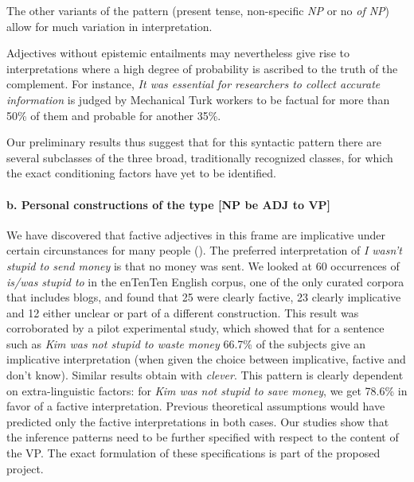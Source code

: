 \documentclass[10pt]{article}
\begin{document}
\vspace{-0.5em}
\vspace{-0.5em}

\noindent
The other variants of the pattern (present tense, non-specific \textit{NP} or no \textit{of NP}) allow for much variation in interpretation.

Adjectives without epistemic entailments may nevertheless give rise to interpretations where a high degree of probability is ascribed to the truth of the complement. For instance, \textit{It was essential for researchers to collect accurate information} is judged by Mechanical Turk workers to be factual for more than 50\% of them and probable for another 35\%. 

Our preliminary results thus suggest that for this syntactic pattern there are several subclasses of the three broad, traditionally recognized classes, for which the exact conditioning factors have yet to be identified.

\vspace{-1.0em}
\paragraph{b. Personal constructions of the type [NP be ADJ to VP]}
We have discovered that factive adjectives in this frame are implicative under certain circunstances for many people (\cite{csli-gang-cssp13}). 
The preferred interpretation of \textit{I wasn't stupid to send money} is that no money was sent. We looked at 60 occurrences of \textit{is/was stupid to} in the enTenTen English corpus, one of the only curated corpora that includes blogs, and found that 25 were clearly factive, 23 clearly implicative and 12 either unclear or part of a different construction. This result was corroborated by a pilot experimental study, which showed that for a sentence such as \textit{Kim was not stupid to waste money} 66.7\% of the subjects give an implicative interpretation (when given the choice between implicative, factive and don't know). Similar results obtain with \textit{clever}.
This pattern is clearly dependent on extra-linguistic factors: for \textit{Kim was not stupid to save money}, we get 78.6\% in favor of a factive interpretation. Previous theoretical assumptions would have predicted only the factive interpretations in both cases. Our studies show that the inference patterns need to be further specified with respect to the content of the VP. The exact formulation
of these specifications is part of the proposed project.
\end{document}
